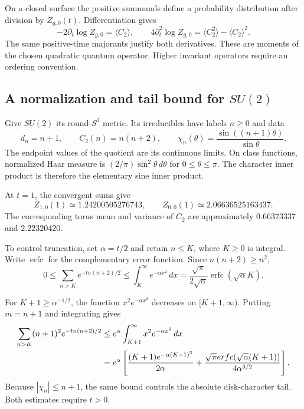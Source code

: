 On a closed surface the positive summands define a probability
distribution after division by $Z_{g,0}(t)$. Differentiation gives
\begin{equation}\label{mht:eq:residual-thermal-response}
 -2\partial_t\log Z_{g,0}=\langle C_2\rangle,
 \qquad
 4\partial_t^2\log Z_{g,0}
       =\langle C_2^2\rangle-\langle C_2\rangle^2.
\end{equation}
The same positive-time majorants justify both derivatives.
These are moments of the chosen quadratic quantum operator.
Higher invariant operators require an ordering convention.

\subsection{A normalization and tail bound for \texorpdfstring{$SU(2)$}{SU(2)}}

Give $SU(2)$ its round-$S^3$ metric. Its irreducibles have labels
$n\geq0$ and data
\[
 d_n=n+1,\qquad C_2(n)=n(n+2),\qquad
 \chi_n(\theta)=\frac{\sin((n+1)\theta)}{\sin\theta}.
\]
The endpoint values of the quotient are its continuous limits.
On class functions, normalized Haar measure is
$(2/\pi)\sin^2\theta\,d\theta$ for $0\leq\theta\leq\pi$.
The character inner product is therefore the elementary sine
inner product.

At $t=1$, the convergent sums give
\[
 Z_{1,0}(1)\simeq1.24200505276743,
 \qquad Z_{0,0}(1)\simeq2.06636525163437.
\]
The corresponding torus mean and variance of $C_2$ are
approximately $0.66373337$ and $2.22320420$.

To control truncation, set $\alpha=t/2$ and retain $n\leq K$,
where $K\geq0$ is integral. Write $\operatorname{erfc}$ for the
complementary error function. Since $n(n+2)\geq n^2$,
\begin{equation}\label{mht:eq:residual-torus-tail}
 0\leq\sum_{n>K}e^{-tn(n+2)/2}
 \leq\int_K^\infty e^{-\alpha x^2}\,dx
 =\frac{\sqrt\pi}{2\sqrt\alpha}
                         \operatorname{erfc}(\sqrt\alpha K).
\end{equation}

For $K+1\geq\alpha^{-1/2}$, the function
$x^2e^{-\alpha x^2}$ decreases on $[K+1,\infty)$.
Putting $m=n+1$ and integrating gives
\begin{align}
 \sum_{n>K}(n+1)^2e^{-tn(n+2)/2}
 &\leq e^\alpha\int_{K+1}^\infty x^2e^{-\alpha x^2}\,dx
       \notag\\
 &=e^\alpha\left[
 \frac{(K+1)e^{-\alpha(K+1)^2}}{2\alpha}
 +\frac{\sqrt\pi\operatorname{erfc}(\sqrt\alpha(K+1))}
                                     {4\alpha^{3/2}}\right].
       \label{mht:eq:residual-sphere-tail}
\end{align}
Because $|\chi_n|\leq n+1$, the same bound controls the
absolute disk-character tail. Both estimates require $t>0$.

